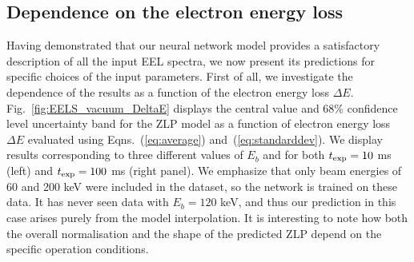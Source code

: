 
\subsection{Dependence on the electron energy loss}
\label{sec:depdeltae}

Having demonstrated that our neural network model provides a satisfactory description
of all the input EEL spectra, we now present its predictions for specific
choices of the input parameters.
%
First of all, we investigate the dependence of the results as a function of the
electron energy loss $\Delta E$.
%
Fig.~\ref{fig:EELS_vacuum_DeltaE} displays the central value and 68\% confidence level uncertainty band
for the ZLP model as a function
of electron energy loss $\Delta E$
evaluated using Eqns.~(\ref{eq:average}) and~(\ref{eq:standarddev}).
%
We display results corresponding to 
three different values of $E_b$ and for both
$t_{\rm exp}=10$ ms (left)  and $t_{\rm exp}=100$ ms (right panel).
%
We emphasize that only beam energies of 60 and 200 keV were included in the dataset,
so the network is trained on these data.
%
It has never seen data with $E_b=120$ keV, and thus our prediction
in this case arises purely from the model interpolation.
%
It is interesting to note how both the overall normalisation and the shape of
the predicted ZLP depend on the specific operation conditions.

